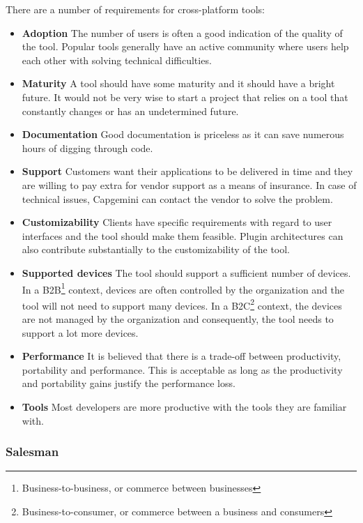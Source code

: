 There are a number of requirements for cross-platform tools:
\begin{itemize}
    \item \textbf{Adoption} The number of users is often a good indication of the quality of the tool. Popular tools generally have an active community where users help each other with solving technical difficulties.
    \item \textbf{Maturity} A tool should have some maturity and it should have a bright future. It would not be very wise to start a project that relies on a tool that constantly changes or has an undetermined future. 
    \item \textbf{Documentation} Good documentation is priceless as it can save numerous hours of digging through code. 
    \item \textbf{Support} Customers want their applications to be delivered in time and they are willing to pay extra for vendor support as a means of insurance. In case of technical issues, Capgemini can contact the vendor to solve the problem. 
    \item \textbf{Customizability} Clients have specific requirements with regard to user interfaces and the tool should make them feasible. Plugin architectures can also contribute substantially to the customizability of the tool.
    \item \textbf{Supported devices} The tool should support a sufficient number of devices. In a B2B\footnote{Business-to-business, or commerce between businesses} context, devices are often controlled by the organization and the tool will not need to support many devices. In a B2C\footnote{Business-to-consumer, or commerce between a business and consumers} context, the devices are not managed by the organization and consequently, the tool needs to support a lot more devices.
    \item \textbf{Performance} It is believed that there is a trade-off between productivity, portability and performance. This is acceptable as long as the productivity and portability gains justify the performance loss. 
    \item \textbf{Tools} Most developers are more productive with the tools they are familiar with. 
\end{itemize}

\subsubsection{Salesman}

